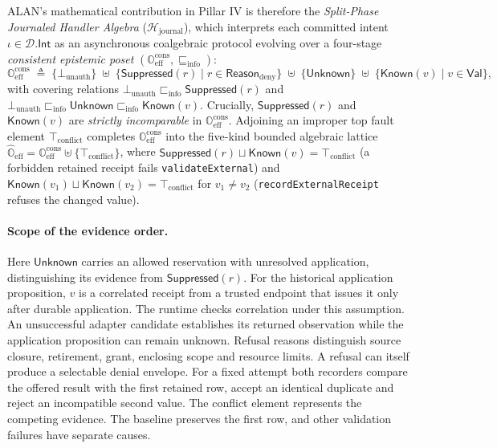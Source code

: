 \documentclass[11pt,a4paper]{article}
\theoremstyle{definition}
\theoremstyle{remark}
\newcommand{\Val}{\mathsf{Val}}
\begin{document}
ALAN's mathematical contribution in Pillar IV is therefore the \emph{Split-Phase Journaled Handler Algebra} ($\mathcal{H}_{\text{journal}}$), which interprets each committed intent $\iota \in \mathcal{D}.\mathsf{Int}$ as an asynchronous coalgebraic protocol evolving over a four-stage \emph{consistent epistemic poset} $(\mathbb{O}_{\text{eff}}^{\text{cons}}, \sqsubseteq_{\text{info}})$:
\[
  \mathbb{O}_{\text{eff}}^{\text{cons}} \;\triangleq\; \{\bot_{\text{unauth}}\} \;\uplus\; \big\{\mathsf{Suppressed}(r) \mid r \in \mathsf{Reason}_{\text{deny}}\big\} \;\uplus\; \{\mathsf{Unknown}\} \;\uplus\; \big\{\mathsf{Known}(v) \mid v \in \Val\big\},
\]
with covering relations $\bot_{\text{unauth}} \sqsubset_{\text{info}} \mathsf{Suppressed}(r)$ and $\bot_{\text{unauth}} \sqsubset_{\text{info}} \mathsf{Unknown} \sqsubset_{\text{info}} \mathsf{Known}(v)$. Crucially, $\mathsf{Suppressed}(r)$ and $\mathsf{Known}(v)$ are \emph{strictly incomparable} in $\mathbb{O}_{\text{eff}}^{\text{cons}}$. Adjoining an improper top fault element $\top_{\text{conflict}}$ completes $\mathbb{O}_{\text{eff}}^{\text{cons}}$ into the five-kind bounded algebraic lattice $\widehat{\mathbb{O}}_{\text{eff}} = \mathbb{O}_{\text{eff}}^{\text{cons}} \uplus \{\top_{\text{conflict}}\}$, where $\mathsf{Suppressed}(r) \sqcup \mathsf{Known}(v) = \top_{\text{conflict}}$ (a forbidden retained receipt fails \texttt{validateExternal}) and $\mathsf{Known}(v_1) \sqcup \mathsf{Known}(v_2) = \top_{\text{conflict}}$ for $v_1 \ne v_2$ (\texttt{recordExternalReceipt} refuses the changed value).

\paragraph{Scope of the evidence order.}
Here $\mathsf{Unknown}$ carries an allowed reservation with unresolved application, distinguishing its evidence from $\mathsf{Suppressed}(r)$. For the historical application proposition, $v$ is a correlated receipt from a trusted endpoint that issues it only after durable application. The runtime checks correlation under this assumption. An unsuccessful adapter candidate establishes its returned observation while the application proposition can remain unknown. Refusal reasons distinguish source closure, retirement, grant, enclosing scope and resource limits. A refusal can itself produce a selectable denial envelope. For a fixed attempt both recorders compare the offered result with the first retained row, accept an identical duplicate and reject an incompatible second value. The conflict element represents the competing evidence. The baseline preserves the first row, and other validation failures have separate causes.
\end{document}
